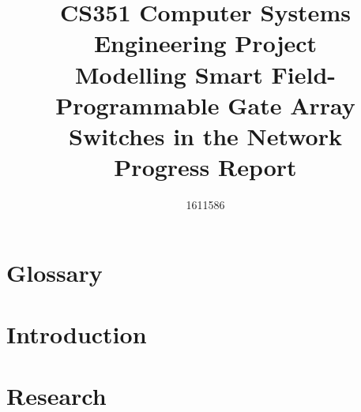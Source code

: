 \documentclass[
  12pt,
  a4paper,
  twoside,
  onecolumn,
  appendixprefix=true,
  toc=chapterentrywithdots,
  toc=bibliography,
  abstract=true,
  toc=listof
]{scrreprt}
\title{CS351 Computer Systems Engineering Project \\ \vspace{0.5cm} Modelling Smart Field-Programmable Gate Array Switches in the Network \\ \vspace{0.3cm} \Large{Progress Report}}
\author{1611586}
\begin{document}
\renewcommand{\sfdefault}{cmr}



\let\oldcleardoublepage\cleardoublepage
\let\cleardoublepage\clearpage



\onehalfspacing

\begin{abstract}
  
\end{abstract}


\renewcommand{\abstractname}{Keywords}
\begin{abstract}
  
\end{abstract}

\renewcommand{\abstractname}{Acknowledgements}
\begin{abstract}
  
\end{abstract}

\let\cleardoublepage\oldcleardoublepage

\tableofcontents

\listoffigures

\listoftables

\newpage

{}
\chapter*{Glossary}
\label{glossary}


\newpage


\chapter{Introduction}
\label{introduction}


\chapter{Research}
\label{research}

\end{document}
